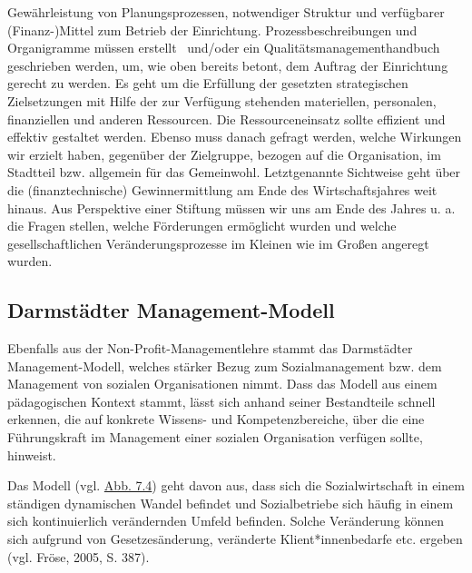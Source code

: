 \documentclass[
  letterpaper,
]{book}
\begin{document}
Gewährleistung von Planungsprozessen, notwendiger Struktur und
verfügbarer (Finanz-)Mittel zum Betrieb der Einrichtung.
Prozessbeschreibungen und Organigramme müssen erstellt ~und/oder ein
Qualitätsmanagementhandbuch geschrieben werden, um, wie oben bereits
betont, dem Auftrag der Einrichtung gerecht zu werden. Es geht um die
Erfüllung der gesetzten strategischen Zielsetzungen mit Hilfe der zur
Verfügung stehenden materiellen, personalen, finanziellen und anderen
Ressourcen. Die Ressourceneinsatz sollte effizient und effektiv
gestaltet werden. Ebenso muss danach gefragt werden, welche Wirkungen
wir erzielt haben, gegenüber der Zielgruppe, bezogen auf die
Organisation, im Stadtteil bzw. allgemein für das Gemeinwohl.
Letztgenannte Sichtweise geht über die (finanztechnische)
Gewinnermittlung am Ende des Wirtschaftsjahres weit hinaus. Aus
Perspektive einer Stiftung müssen wir uns am Ende des Jahres u. a. die
Fragen stellen, welche Förderungen ermöglicht wurden und welche
gesellschaftlichen Veränderungsprozesse im Kleinen wie im Großen
angeregt wurden.

\subsection{Darmstädter
Management-Modell}\label{darmstdter-management-modell}

Ebenfalls aus der Non-Profit-Managementlehre stammt das Darmstädter
Management-Modell, welches stärker Bezug zum Sozialmanagement bzw. dem
Management von sozialen Organisationen nimmt. Dass das Modell aus einem
pädagogischen Kontext stammt, lässt sich anhand seiner Bestandteile
schnell erkennen, die auf konkrete Wissens- und Kompetenzbereiche, über
die eine Führungskraft im Management einer sozialen Organisation
verfügen sollte, hinweist.

Das Modell (vgl. \hyperref[figure74]{Abb. 7.4}) geht davon aus, dass
sich die Sozialwirtschaft in einem ständigen dynamischen Wandel befindet
und Sozialbetriebe sich häufig in einem sich kontinuierlich verändernden
Umfeld befinden. Solche Veränderung können sich aufgrund von
Gesetzesänderung, veränderte Klient*innenbedarfe etc. ergeben (vgl.
Fröse, 2005, S. 387).
\end{document}
